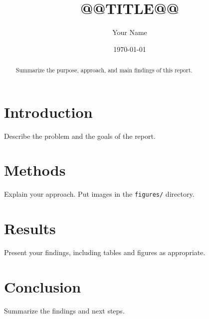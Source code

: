 \documentclass[11pt,letterpaper]{article}
\title{@@TITLE@@}
\author{Your Name}
\date{\today}
\begin{document}
\maketitle

\begin{abstract}
Summarize the purpose, approach, and main findings of this report.
\end{abstract}

\section{Introduction}
Describe the problem and the goals of the report.

\section{Methods}
Explain your approach. Put images in the \texttt{figures/} directory.

\section{Results}
Present your findings, including tables and figures as appropriate.

\section{Conclusion}
Summarize the findings and next steps.
\end{document}
